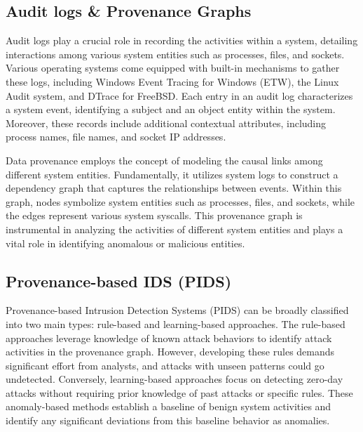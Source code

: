 
\subsection{Audit logs \& Provenance Graphs}

Audit logs play a crucial role in recording the activities within a system, detailing interactions among various system entities such as processes, files, and sockets. Various operating systems come equipped with built-in mechanisms to gather these logs, including Windows Event Tracing for Windows (ETW), the Linux Audit system, and DTrace for FreeBSD. Each entry in an audit log characterizes a system event, identifying a subject and an object entity within the system. Moreover, these records include additional contextual attributes, including process names, file names, and socket IP addresses.

Data provenance employs the concept of modeling the causal links among different system entities. Fundamentally, it utilizes system logs to construct a dependency graph that captures the relationships between events. Within this graph, nodes symbolize system entities such as processes, files, and sockets, while the edges represent various system syscalls. This provenance graph is instrumental in analyzing the activities of different system entities and plays a vital role in identifying anomalous or malicious entities.


\subsection{Provenance-based IDS (PIDS)}


Provenance-based Intrusion Detection Systems (PIDS) can be broadly classified into two main types: rule-based and learning-based approaches. The rule-based approaches leverage knowledge of known attack behaviors to identify attack activities in the provenance graph. However, developing these rules demands significant effort from analysts, and attacks with unseen patterns could go undetected. Conversely, learning-based approaches focus on detecting zero-day attacks without requiring prior knowledge of past attacks or specific rules. These anomaly-based methods establish a baseline of benign system activities and identify any significant deviations from this baseline behavior as anomalies.

